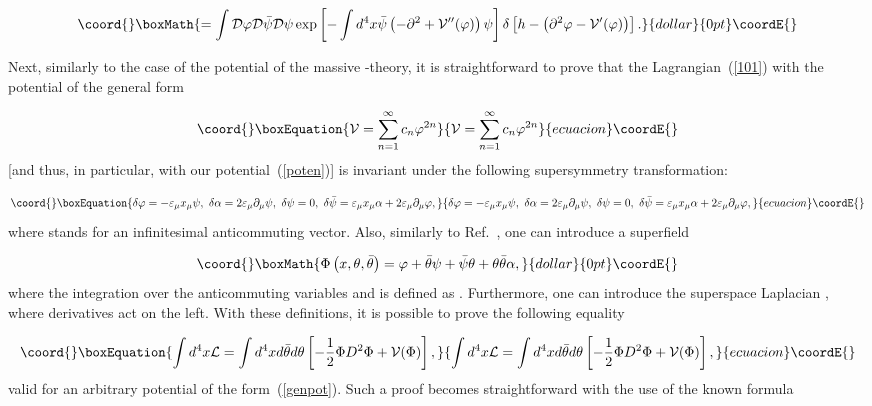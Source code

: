 \documentclass[a4paper,12pt]{article}
\begin{document}
$$\coord{}\boxMath{=\int {\cal D}\varphi{\cal D}\bar\psi{\cal D}\psi
\exp\left[-\int d^4x\bar\psi\left(-\partial^2+{\cal V}''(\varphi)\right)\psi\right]
\delta\left[h-\left(\partial^2\varphi-{\cal V}'(\varphi)\right)\right].}{dollar}{0pt}\coordE{}$$
  
Next, similarly to the case of the potential of the massive \coordHE{}-theory, it is straightforward
to prove that the Lagrangian~(\ref{101}) with the potential \coordHE{} of the general form 

\begin{equation}\coord{}\boxEquation{
\label{genpot}
{\cal V}=\sum\limits_{n=1}^{\infty}
c_n\varphi^{2n}
}{
{\cal V}=\sum\limits_{n=1}^{\infty}
c_n\varphi^{2n}
}{ecuacion}\coordE{}\end{equation} 
[and thus, in particular, with our potential~(\ref{poten})]
is invariant under the following supersymmetry transformation: 

\begin{equation}\coord{}\boxEquation{
\label{trans}
\delta\varphi=-\varepsilon_\mu x_\mu\psi,~ 
\delta\alpha=2\varepsilon_\mu\partial_\mu\psi,~
\delta\psi=0,~
\delta\bar\psi=\varepsilon_\mu x_\mu\alpha+2\varepsilon_\mu\partial_\mu\varphi,
}{
\delta\varphi=-\varepsilon_\mu x_\mu\psi,~ 
\delta\alpha=2\varepsilon_\mu\partial_\mu\psi,~
\delta\psi=0,~
\delta\bar\psi=\varepsilon_\mu x_\mu\alpha+2\varepsilon_\mu\partial_\mu\varphi,
}{ecuacion}\coordE{}\end{equation}
where \myHighlight{$\varepsilon_\mu$}\coordHE{} stands for an infinitesimal anticommuting vector. Also, similarly to Ref.~\cite{ps}, 
one can introduce a superfield 

$$\coord{}\boxMath{\Phi\left(x,\theta,\bar\theta\right)=\varphi+\bar\theta\psi+\bar\psi\theta+\theta\bar\theta\alpha,}{dollar}{0pt}\coordE{}$$
where the integration over the anticommuting variables \myHighlight{$\theta$}\coordHE{} and \myHighlight{$\bar\theta$}\coordHE{} is defined as 
\coordHE{}. Furthermore, one can introduce the superspace Laplacian 
\coordHE{}, where derivatives act on the left.
With these definitions, it is possible to prove the following equality

\begin{equation}\coord{}\boxEquation{
\label{susy}
\int d^4x{\cal L}=\int d^4xd\bar\theta d\theta\left[-\frac12\Phi D^2\Phi+{\cal V}(\Phi)\right],
}{
\int d^4x{\cal L}=\int d^4xd\bar\theta d\theta\left[-\frac12\Phi D^2\Phi+{\cal V}(\Phi)\right],
}{ecuacion}\coordE{}\end{equation}
valid for an arbitrary potential of the form~(\ref{genpot}). Such a proof becomes 
straightforward with the use of the known formula
\end{document}
